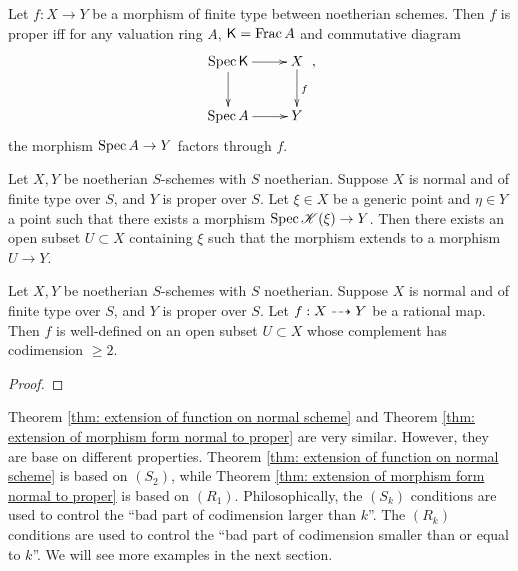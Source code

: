     \begin{theorem}\label{thm: valuation criterion for properness}
        Let $f:X \to Y$ be a morphism of finite type between noetherian schemes.
        Then $f$ is proper iff for any valuation ring $A$, ${\mathsf{K}} = \operatorname{Frac} A$ and commutative diagram
        \[ \xymatrix{
            \Spec \KK \ar[r] \ar[d] & X \ar[d]^f \\
            \Spec A \ar[r] & Y
        }, \]
        the morphism $\operatorname{Spec} A \to Y$ factors through $f$.
    \end{theorem}

    \begin{proposition}\label{prop: morphism defined on a generic point extends to a open subset}
        Let $X,Y$ be noetherian $S$-schemes with $S$ noetherian.
        Suppose $X$ is normal and of finite type over $S$, and $Y$ is proper over $S$.
        Let $\xi \in X$ be a generic point and $\eta \in Y$ a point such that there exists a morphism $\operatorname{Spec} {\mathscr{K}}(\xi) \to Y$.
        Then there exists an open subset $U \subset X$ containing $\xi$ such that the morphism extends to a morphism $U \to Y$.
    \end{proposition}

    \begin{theorem}\label{thm: extension of morphism form normal to proper}
        Let $X,Y$ be noetherian $S$-schemes with $S$ noetherian.
        Suppose $X$ is normal and of finite type over $S$, and $Y$ is proper over $S$.
        Let $f:X \dasharrow Y$ be a rational map.
        Then $f$ is well-defined on an open subset $U \subset X$ whose complement has codimension $\geq 2$.
    \end{theorem}
    \begin{proof}
    \end{proof}

    \begin{remark}
        Theorem \ref{thm: extension of function on normal scheme} and Theorem \ref{thm: extension of morphism form normal to proper} are very similar.
        However, they are base on different properties.
        Theorem \ref{thm: extension of function on normal scheme} is based on $(S_2)$, while Theorem \ref{thm: extension of morphism form normal to proper} is based on $(R_1)$.
        Philosophically, the $(S_k)$ conditions are used to control the ``bad part of codimension larger than $k$''.
        The $(R_k)$ conditions are used to control the ``bad part of codimension smaller than or equal to $k$''.
        We will see more examples in the next section.
    \end{remark}





